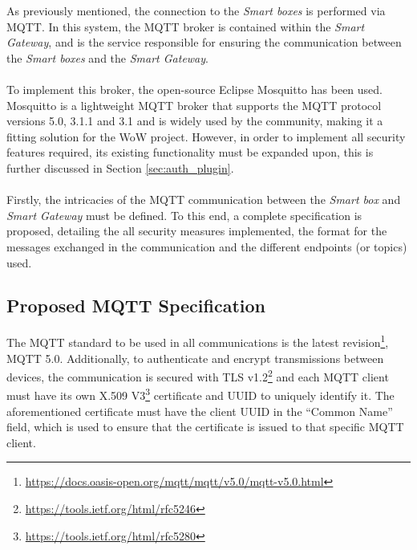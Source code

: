 
As previously mentioned, the connection to the \textit{Smart boxes} is performed via \acs{MQTT}. In this system, the \acs{MQTT} broker is contained within the \textit{Smart Gateway}, and is the service responsible for ensuring the communication between the \textit{Smart boxes} and the \textit{Smart Gateway}.

\paragraph{} To implement this broker, the open-source Eclipse Mosquitto \cite{mosquitto} has been used. Mosquitto is a lightweight \acs{MQTT} broker that supports the \acs{MQTT} protocol versions 5.0, 3.1.1 and 3.1 and is widely used by the community, making it a fitting solution for the \acs{WoW} project. However, in order to implement all security features required, its existing functionality must be expanded upon, this is further discussed in Section \ref{sec:auth_plugin}.

\paragraph{} Firstly, the intricacies of the \acs{MQTT} communication between the \textit{Smart box} and \textit{Smart Gateway} must be defined. To this end, a complete specification is proposed, detailing the all security measures implemented, the format for the messages exchanged in the communication and the different endpoints (or topics) used. 

\subsection{Proposed \acs{MQTT} Specification}

The \acs{MQTT} standard to be used in all communications is the latest revision\footnote{\url{https://docs.oasis-open.org/mqtt/mqtt/v5.0/mqtt-v5.0.html}}, MQTT 5.0. Additionally, to authenticate and encrypt transmissions between devices, the communication is secured with \acs{TLS} v1.2\footnote{\url{https://tools.ietf.org/html/rfc5246}} and each \acs{MQTT} client must have its own X.509 V3\footnote{\url{https://tools.ietf.org/html/rfc5280}} certificate and \acs{UUID} to uniquely identify it. 
The aforementioned certificate must have the client \acs{UUID} in the ``Common Name'' field, which is used to ensure that the certificate is issued to that specific \acs{MQTT} client.

